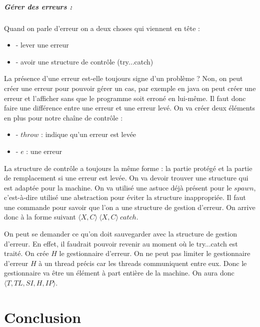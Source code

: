\documentclass[10pt,a4paper]{report}
\begin{document}
\paragraph{Gérer des erreurs :} Quand on parle d'erreur on a deux choses qui viennent en tête :
\begin{itemize}
\item[] - lever une erreur
\item[] - avoir une structure de contrôle (try...catch)
\end{itemize}
La présence d'une erreur est-elle toujours signe d'un problème ? Non, on peut créer une erreur pour pouvoir gérer un cas, par exemple en java on peut créer une erreur et l'afficher sans que le programme soit erroné en lui-même. Il faut donc faire une différence entre une erreur et une erreur levé. On va créer deux éléments en plus pour notre chaîne de contrôle :
\begin{itemize}
\item[] - $throw$ : indique qu'un erreur est levée
\item[] - $e$ : une erreur
\end{itemize} 
La structure de contrôle a toujours la même forme : la partie protégé et la partie de remplacement si une erreur est levée. On va devoir trouver une structure qui est adaptée pour la machine. On va utilisé une astuce déjà présent pour le $spawn$, c'est-à-dire utilisé une abstraction pour éviter la structure inappropriée. Il faut une commande pour savoir que l'on a une structure de gestion d'erreur. On arrive donc à la forme suivant $\langle X,C\rangle~\langle X,C\rangle~catch$.
\medbreak

On peut se demander ce qu'on doit sauvegarder avec la structure de gestion d'erreur. En effet, il faudrait pouvoir revenir au moment où le try...catch est traité. On crée $H$ le gestionnaire d'erreur. On ne peut pas limiter le gestionnaire d'erreur $H$ à un thread précis car les threads communiquent entre eux. Donc le gestionnaire va être un élément à part entière de la machine. On aura donc $\langle T,TL,SI,H,IP\rangle$.







\chapter{Conclusion}
\end{document}
